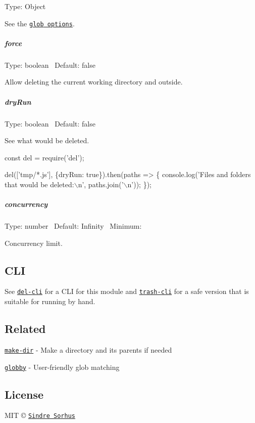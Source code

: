 Type\+: {\ttfamily Object}

See the \href{https://github.com/isaacs/node-glob#options}{\tt {\ttfamily glob} options}.

\subparagraph*{force}

Type\+: {\ttfamily boolean}~\newline
 Default\+: {\ttfamily false}

Allow deleting the current working directory and outside.

\subparagraph*{dry\+Run}

Type\+: {\ttfamily boolean}~\newline
 Default\+: {\ttfamily false}

See what would be deleted.


\begin{DoxyCode}
const del = require('del');

del(['tmp/*.js'], \{dryRun: true\}).then(paths => \{
    console.log('Files and folders that would be deleted:\(\backslash\)n', paths.join('\(\backslash\)n'));
\});
\end{DoxyCode}


\subparagraph*{concurrency}

Type\+: {\ttfamily number}~\newline
 Default\+: {\ttfamily Infinity}~\newline
 Minimum\+: {}

Concurrency limit.

\subsection*{C\+LI}

See \href{https://github.com/sindresorhus/del-cli}{\tt del-\/cli} for a C\+LI for this module and \href{https://github.com/sindresorhus/trash-cli}{\tt trash-\/cli} for a safe version that is suitable for running by hand.

\subsection*{Related}


\begin{DoxyItemize}
\item \href{https://github.com/sindresorhus/make-dir}{\tt make-\/dir} -\/ Make a directory and its parents if needed
\item \href{https://github.com/sindresorhus/globby}{\tt globby} -\/ User-\/friendly glob matching
\end{DoxyItemize}

\subsection*{License}

M\+IT © \href{https://sindresorhus.com}{\tt Sindre Sorhus} 